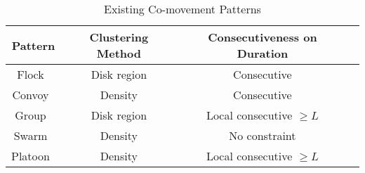\begin{table}
\centering
\begin{tabular}{|c|c|c|c|}
\hline 
Pattern & Clustering Method & Consecutiveness on Duration \\ 
\hline 
Flock~\cite{gudmundsson2004flock} & Disk region &  Consecutive \\ 
\hline 
Convoy~\cite{jeung2008convoy} & Density &   Consecutive \\ 
\hline 
Group~\cite{wang2006grouppattern} & Disk region &  Local consecutive $\geq L$ \\ 
\hline 
Swarm~\cite{li2010swarm} & Density  & No constraint \\ 
\hline 
Platoon~\cite{li2015platoon} & Density &  Local consecutive $\geq L$ \\ 
\hline 
\end{tabular} 
\caption{Existing Co-movement Patterns}
\label{tbl:existing_co_patterns}
\end{table}

% 


